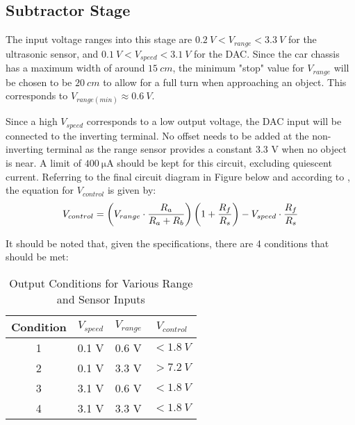\subsection{Subtractor Stage}
The input voltage ranges into this stage are $\SI{0.2}{V} < V_{range} < \SI{3.3}{V}$ for the ultrasonic sensor, and $\SI{0.1}{V} < V_{speed} < \SI{3.1}{V}$ for the DAC.
Since the car chassis has a maximum width of around $\SI{15}{cm}$, the minimum "stop" value for $V_{range}$ will be chosen to be $\SI{20}{cm}$ to allow for a full turn when approaching an object.
This corresponds to $V_{range(min)} \approx \SI{0.6}{V}$.

Since a high $V_{speed}$ corresponds to a low output voltage, the DAC input will be connected to the inverting terminal. No offset needs to be added at the non-inverting terminal
as the range sensor provides a constant 3.3 V when no object is near. A limit of $\SI{400}{\micro\ampere}$ should be kept for this circuit, excluding quiescent current.
Referring to the final circuit diagram in Figure below and according to \cite{opAmpSumDiff}, the equation for $V_{control}$ is given by:
\begin{equation}{\label{eqn:opAmpSumDiff}}
    V_{control} = \left( V_{range} \cdot \frac{R_a}{R_a + R_b} \right) \left(1 + \frac{R_f}{R_s} \right) - V_{speed} \cdot \frac{R_f}{R_s}
\end{equation}

\noindent It should be noted that, given the specifications, there are 4 conditions that should be met:
\begin{table}[!h]
  \centering
  \renewcommand{\arraystretch}{1.2}
  \begin{tabular}{ |c|c|c|c| }
    \hline
    Condition                 & \textbf{$V_{speed}$}         & \textbf{$V_{range}$}        & \textbf{$V_{control}$}       \\
    \hline
    1                         &  0.1 V                        & 0.6 V                       & $< \SI{1.8}{V}$              \\
    2                         &  0.1 V                        & 3.3 V                       & $> \SI{7.2}{V}$              \\
    3                         &  3.1 V                        & 0.6 V                       & $< \SI{1.8}{V}$              \\
    4                         &  3.1 V                        & 3.3 V                       & $< \SI{1.8}{V}$              \\
    \hline
  \end{tabular}
  \caption{Output Conditions for Various Range and Sensor Inputs}
\end{table}

